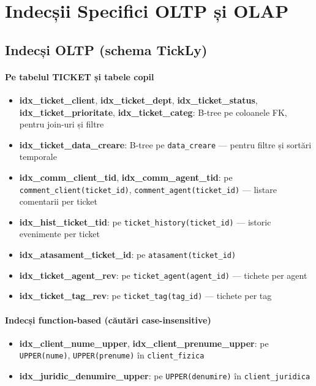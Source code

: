 \chapter{Indecșii Specifici OLTP și OLAP}
\label{sec:indecsi}

\section{Indecși OLTP (schema TickLy)}

\subsubsection{Pe tabelul TICKET și tabele copil}

\begin{itemize}
    \item \textbf{idx\_ticket\_client}, \textbf{idx\_ticket\_dept}, \textbf{idx\_ticket\_status}, \textbf{idx\_ticket\_prioritate}, \textbf{idx\_ticket\_categ}: B-tree pe coloanele FK, pentru join-uri și filtre
    \item \textbf{idx\_ticket\_data\_creare}: B-tree pe \texttt{data\_creare} — pentru filtre și sortări temporale
    \item \textbf{idx\_comm\_client\_tid}, \textbf{idx\_comm\_agent\_tid}: pe \texttt{comment\_client(ticket\_id)}, \texttt{comment\_agent(ticket\_id)} — listare comentarii per ticket
    \item \textbf{idx\_hist\_ticket\_tid}: pe \texttt{ticket\_history(ticket\_id)} — istoric evenimente per ticket
    \item \textbf{idx\_atasament\_ticket\_id}: pe \texttt{atasament(ticket\_id)}
    \item \textbf{idx\_ticket\_agent\_rev}: pe \texttt{ticket\_agent(agent\_id)} — tichete per agent
    \item \textbf{idx\_ticket\_tag\_rev}: pe \texttt{ticket\_tag(tag\_id)} — tichete per tag
\end{itemize}

\subsubsection{Indecși function-based (căutări case-insensitive)}

\begin{itemize}
    \item \textbf{idx\_client\_nume\_upper}, \textbf{idx\_client\_prenume\_upper}: pe \texttt{UPPER(nume)}, \texttt{UPPER(prenume)} în \texttt{client\_fizica}
    \item \textbf{idx\_juridic\_denumire\_upper}: pe \texttt{UPPER(denumire)} în \texttt{client\_juridica}
\end{itemize}

